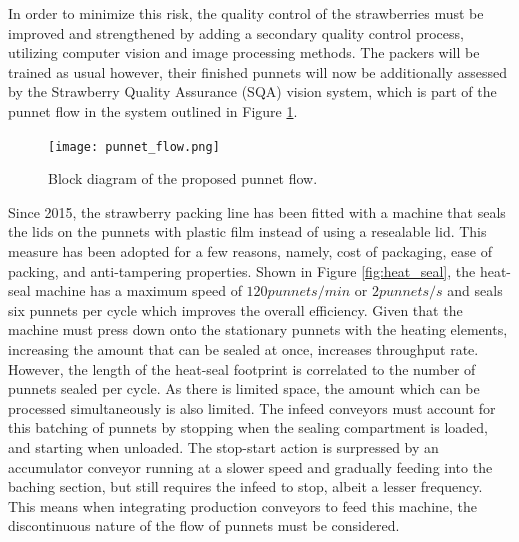 \documentclass[fleqn,twoside,12pt]{report}
\begin{document}
In order to minimize this risk, the quality control of the strawberries must be improved and strengthened by adding a secondary quality control process, utilizing computer vision and image processing methods. The packers will be trained as usual however, their finished punnets will now be additionally assessed by the Strawberry Quality Assurance (SQA) vision system, which is part of the punnet flow in the system outlined in Figure \ref{fig:punnet_flow}. 

\begin{figure}[h]
	\centering
	\texttt{[image: punnet\_flow.png]}
	\caption{Block diagram of the proposed punnet flow.}
	\label{fig:punnet_flow}
\end{figure}

Since 2015, the strawberry packing line has been fitted with a machine that seals the lids on the punnets with plastic film instead of using a resealable lid. This measure has been adopted for a few reasons, namely, cost of packaging, ease of packing, and anti-tampering properties. Shown in Figure \ref{fig:heat_seal}, the heat-seal machine has a maximum speed of $120 punnets/min$ or $2 punnets/s$ and seals six punnets per cycle which improves the overall efficiency. Given that the machine must press down onto the stationary punnets with the heating elements, increasing the amount that can be sealed at once, increases throughput rate. However, the length of the heat-seal footprint is correlated to the number of punnets sealed per cycle. As there is limited space, the amount which can be processed simultaneously is also limited. The infeed conveyors must account for this batching of punnets by stopping when the sealing compartment is loaded, and starting when unloaded. The stop-start action is surpressed by an accumulator conveyor running at a slower speed and gradually feeding into the baching section, but still requires the infeed to stop, albeit a lesser frequency. This means when integrating production conveyors to feed this machine, the discontinuous nature of the flow of punnets must be considered.
\end{document}
